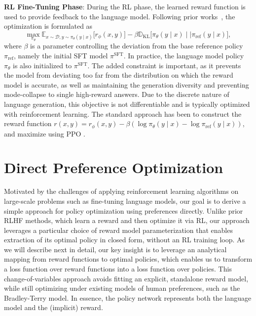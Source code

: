 \documentclass{article}
\newcommand{\rev}[2]{{#2}}
\newcommand{\piref}{\pi_\text{ref}}
\newcommand{\pisft}{\pi^\text{SFT}} %
\begin{document}
\textbf{RL Fine-Tuning Phase}: During the RL phase, the learned reward function is used to provide feedback to the language model. Following prior works~\citep{jaques2017sequence, jaques2020human}, the optimization is formulated as
\begin{equation}\label{eq:RL}
\max_{\pi_{\theta}}  \mathbb{E}_{x\sim \mathcal{D}, y\sim \pi_{\theta}(y \mid x)}\bigl[r_{\phi}(x, y)\bigr] - \beta\mathbb{D}_{\textrm{KL}}\bigl[\pi_{\theta}(y\mid x)\mid \mid \piref(y\mid x)\bigr],
\end{equation}
where $\beta$ is a parameter controlling the deviation from the base reference policy $\piref$, namely the initial SFT model $\pisft$. 
In practice, the language model policy $\pi_\theta$ is also initialized to $\pisft$. The added constraint is important, as it prevents the model from deviating too far from the distribution on which the reward model is accurate, as well as maintaining the generation diversity and preventing mode-collapse to single high-reward answers. Due to the discrete nature of language generation, this objective is not differentiable and is typically optimized with reinforcement learning. The standard approach \citep{ziegler2020finetuning, stiennon2022learning, bai2022training, ouyang2022training} has been to construct the reward function ${r(x, y) = r_{\phi}(x, y) -\beta (\log \pi_{\theta}(y\mid x) - \log \piref(y\mid x))}$, and maximize using PPO \cite{schulman2017proximal}. 

\section{Direct Preference Optimization}\label{sec:DPO}

Motivated by the challenges of applying reinforcement learning algorithms on large-scale problems such as fine-tuning language models, our goal is to derive a simple approach for policy optimization using preferences directly. Unlike prior RLHF methods, which learn a reward and then optimize it via RL, our approach \rev{bypasses the reward modeling step and directly optimizes a language model using preference data}{leverages a particular choice of reward model parameterization that enables extraction of its optimal policy in closed form, without an RL training loop}. 
As we will describe next in detail, our key insight is to leverage an analytical mapping from reward functions to optimal policies, which enables us to transform a loss function over reward functions into a loss function over policies.
This change-of-variables approach \rev{allows us to skip the explicit reward modeling step}{avoids fitting an explicit, standalone reward model}, while still optimizing under existing models of human preferences, such as the Bradley-Terry model. In essence, the policy network represents both the language model and the \rev{}{(implicit)} reward.
\end{document}
